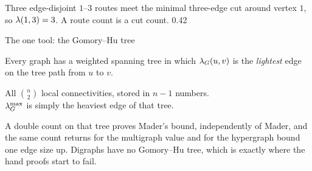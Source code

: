 \documentclass[aspectratio=1610,11pt]{beamer}
\begin{document}
  {\figmenger}
  {Three edge-disjoint $1$--$3$ routes meet the minimal three-edge cut around vertex $1$, so $\lambda(1,3)=3$. A route count is a cut count.}
  {0.42}

\begin{frame}{The one tool: the Gomory--Hu tree}
\vfill
\centering
\begin{minipage}{0.82\textwidth}
{\large Every graph has a weighted spanning tree in which $\lambda_G(u,v)$ is the \emph{lightest} edge on the tree path from $u$ to $v$.}
\end{minipage}

\vspace{20pt}
{\color{KULblauw3b}\large All $\binom{n}{2}$ local connectivities, stored in $n-1$ numbers.}\\[6pt]
{\color{KULblauw1}\large $\lambda^{\max}_G$ is simply the heaviest edge of that tree.}

\vspace{22pt}
\begin{minipage}{0.86\textwidth}
{\footnotesize\color{black!60} A double count on that tree proves Mader's bound, independently of Mader, and the same count returns for the multigraph value and for the hypergraph bound one edge size up. Digraphs have no Gomory--Hu tree, which is exactly where the hand proofs start to fail.}
\end{minipage}
\vfill
\end{frame}

\end{document}
